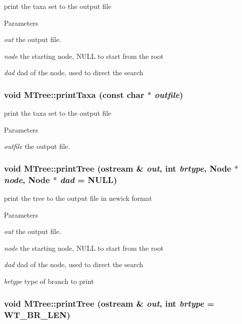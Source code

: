 \label{classMTree_a192b058b88470afc75cc588d8c6ebf3d}
print the taxa set to the output file 
\begin{DoxyParams}{Parameters}
\item[{\em out}]the output file. \item[{\em node}]the starting node, NULL to start from the root \item[{\em dad}]dad of the node, used to direct the search \end{DoxyParams}
\hypertarget{classMTree_a5d39b487a997d5f5792c19fdc2db0dbe}{
\subsubsection[{printTaxa}]{\setlength{\rightskip}{0pt plus 5cm}void MTree::printTaxa (const char $\ast$ {\em outfile})}}
\label{classMTree_a5d39b487a997d5f5792c19fdc2db0dbe}
print the taxa set to the output file 
\begin{DoxyParams}{Parameters}
\item[{\em outfile}]the output file. \end{DoxyParams}
\hypertarget{classMTree_a822157e8fc26b2d434cc5c1e3129fdf0}{
\subsubsection[{printTree}]{\setlength{\rightskip}{0pt plus 5cm}void MTree::printTree (ostream \& {\em out}, \/  int {\em brtype}, \/  {\bf Node} $\ast$ {\em node}, \/  {\bf Node} $\ast$ {\em dad} = {\ttfamily NULL})}}
\label{classMTree_a822157e8fc26b2d434cc5c1e3129fdf0}
print the tree to the output file in newick format 
\begin{DoxyParams}{Parameters}
\item[{\em out}]the output file. \item[{\em node}]the starting node, NULL to start from the root \item[{\em dad}]dad of the node, used to direct the search \item[{\em brtype}]type of branch to print \end{DoxyParams}
\hypertarget{classMTree_a55093d54d06d5e8841799a9bf7a0ce87}{
\subsubsection[{printTree}]{\setlength{\rightskip}{0pt plus 5cm}void MTree::printTree (ostream \& {\em out}, \/  int {\em brtype} = {\ttfamily WT\_\-BR\_\-LEN})}}
